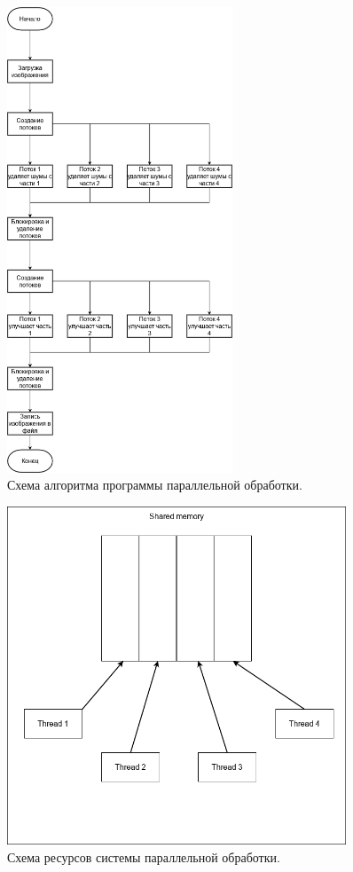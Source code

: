 \documentclass[14pt, a4paper, simple]{eskdtext}
\begin{document}
    \begin{figure}[ht]
        \begin{center}
            \includegraphics[width=0.6\textwidth]{../resources/shemas/shema2}
        \end{center}
        \caption{Схема алгоритма программы параллельной обработки.}
    \end{figure}
    \begin{figure}[ht]
        \begin{center}
            \includegraphics[width=0.9\textwidth]{../resources/shemas/shema3}
        \end{center}
        \caption{Схема ресурсов системы параллельной обработки.}
    \end{figure}
\end{document}
